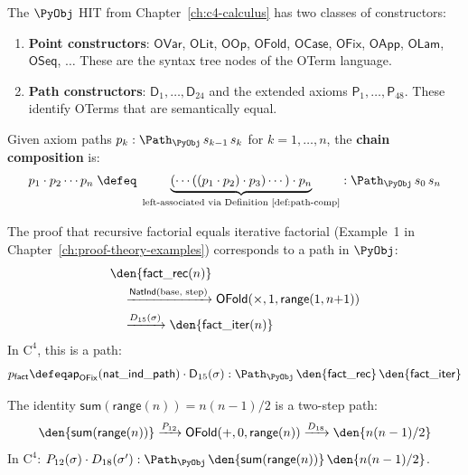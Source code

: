 The $\PyObj$ HIT from Chapter~\ref{ch:c4-calculus} has two classes of
constructors:

\begin{enumerate}
\item \textbf{Point constructors}: $\mathsf{OVar}$, $\mathsf{OLit}$,
  $\mathsf{OOp}$, $\mathsf{OFold}$, $\mathsf{OCase}$, $\mathsf{OFix}$,
  $\mathsf{OApp}$, $\mathsf{OLam}$, $\mathsf{OSeq}$, $\ldots$
  These are the syntax tree nodes of the OTerm language.

\item \textbf{Path constructors}: $\mathsf{D}_1, \ldots, \mathsf{D}_{24}$
  and the extended axioms $\mathsf{P}_1, \ldots, \mathsf{P}_{48}$.
  These identify OTerms that are semantically equal.
\end{enumerate}

\begin{definition}
Given axiom paths $p_k : \Path_\PyObj\, s_{k-1}\, s_k$ for
$k = 1, \ldots, n$, the \textbf{chain composition} is:
\[
  p_1 \cdot p_2 \cdots p_n \;\defeq\;
  \underbrace{(\cdots((p_1 \cdot p_2) \cdot p_3) \cdots) \cdot p_n}_{
    \text{left-associated via Definition~\ref{def:path-comp}}}
  : \Path_\PyObj\, s_0\, s_n
\]
\end{definition}

\begin{example}
The proof that recursive factorial equals iterative factorial
(Example~1 in Chapter~\ref{ch:proof-theory-examples}) corresponds to a
path in $\PyObj$:
\begin{align*}
  &\den{\mathsf{fact\_rec}(n)} \\
  &\quad \xrightarrow{\mathsf{NatInd}(\text{base, step})}
    \mathsf{OFold}(\times, 1, \mathsf{range}(1, n{+}1)) \\
  &\quad \xrightarrow{D_{15}(\sigma)}
    \den{\mathsf{fact\_iter}(n)}
\end{align*}
In $\mathrm{C}^4$, this is a path:
\[
  p_{\mathsf{fact}} \defeq
  \mathsf{ap}_{\mathsf{OFix}}(\mathsf{nat\_ind\_path}) \cdot
  \mathsf{D}_{15}(\sigma)
  : \Path_\PyObj\, \den{\mathsf{fact\_rec}}\, \den{\mathsf{fact\_iter}}
\]
\end{example}

\begin{example}
The identity $\mathsf{sum}(\mathsf{range}(n)) = n(n-1)/2$ is a
two-step path:
\[
  \den{\mathsf{sum}(\mathsf{range}(n))}
  \xrightarrow{P_{12}}
  \mathsf{OFold}(+, 0, \mathsf{range}(n))
  \xrightarrow{D_{18}}
  \den{n(n-1)/2}
\]
In $\mathrm{C}^4$: $P_{12}(\sigma) \cdot D_{18}(\sigma') :
\Path_\PyObj\, \den{\mathsf{sum}(\mathsf{range}(n))}\,
\den{n(n-1)/2}$.
\end{example}


